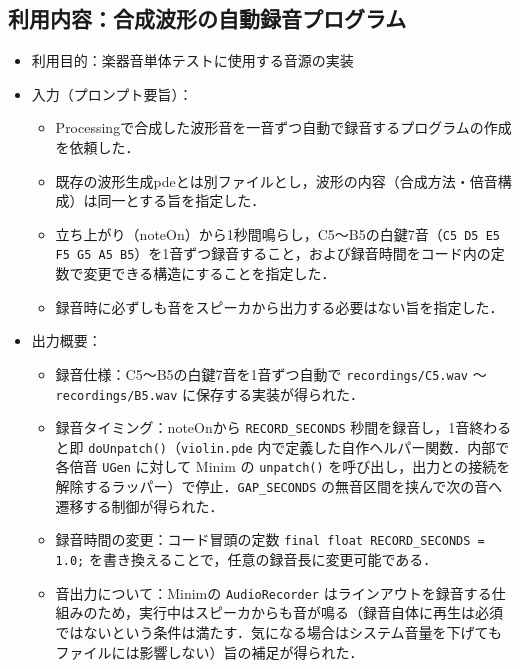 \documentclass[lualatex,paper=a4paper,jafontsize=11.5pt,jafontscale=1.05]{jlreq}
\begin{document}
\subsection{利用内容：合成波形の自動録音プログラム}
\begin{itemize}
    \item 利用目的：楽器音単体テストに使用する音源の実装
    \item 入力（プロンプト要旨）：
    \begin{itemize}
        \item Processingで合成した波形音を一音ずつ自動で録音するプログラムの作成を依頼した．
        \item 既存の波形生成pdeとは別ファイルとし，波形の内容（合成方法・倍音構成）は同一とする旨を指定した．
        \item 立ち上がり（noteOn）から1秒間鳴らし，C5〜B5の白鍵7音（\texttt{C5 D5 E5 F5 G5 A5 B5}）を1音ずつ録音すること，および録音時間をコード内の定数で変更できる構造にすることを指定した．
        \item 録音時に必ずしも音をスピーカから出力する必要はない旨を指定した．
    \end{itemize}
    \item 出力概要：
    \begin{itemize}
        \item 録音仕様：C5〜B5の白鍵7音を1音ずつ自動で \texttt{recordings/C5.wav} 〜 \texttt{recordings/B5.wav} に保存する実装が得られた．
        \item 録音タイミング：noteOnから \texttt{RECORD\_SECONDS} 秒間を録音し，1音終わると即 \texttt{doUnpatch()}（\texttt{violin.pde} 内で定義した自作ヘルパー関数．内部で各倍音 \texttt{UGen} に対して Minim の \texttt{unpatch()}\cite{minim_unpatch} を呼び出し，出力との接続を解除するラッパー）で停止．\texttt{GAP\_SECONDS} の無音区間を挟んで次の音へ遷移する制御が得られた．
        \item 録音時間の変更：コード冒頭の定数 \texttt{final float RECORD\_SECONDS = 1.0;} を書き換えることで，任意の録音長に変更可能である．
        \item 音出力について：Minimの \texttt{AudioRecorder} はラインアウトを録音する仕組みのため，実行中はスピーカからも音が鳴る（録音自体に再生は必須ではないという条件は満たす．気になる場合はシステム音量を下げてもファイルには影響しない）旨の補足が得られた．
    \end{itemize}
\end{itemize}
\end{document}

